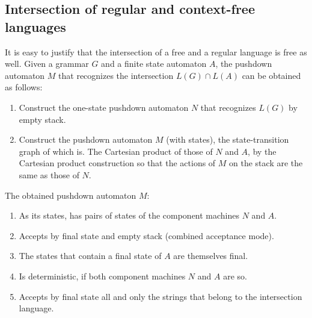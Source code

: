 \subsection*{Intersection of regular and context-free languages}
It is easy to justify that the intersection of a free and a regular language is free as well. 
Given a grammar $G$ and a finite state automaton $A$, the pushdown automaton $M$ that recognizes the intersection $L(G) \cap L(A)$ can be obtained as follows: 
\begin{enumerate}
    \item Construct the one-state pushdown automaton $N$ that recognizes $L (G)$ by empty stack. 
    \item Construct the pushdown automaton $M$ (with states), the state-transition graph of which is. 
        The Cartesian product of those of $N$ and $A$, by the Cartesian product construction so that the actions of $M$ on the stack are the same as those of $N$. 
\end{enumerate}
The obtained pushdown automaton $M$: 
\begin{enumerate}
    \item As its states, has pairs of states of the component machines $N$ and $A$. 
    \item Accepts by final state and empty stack (combined acceptance mode). 
    \item The states that contain a final state of $A$ are themselves final. 
    \item Is deterministic, if both component machines $N$ and $A$ are so. 
    \item Accepts by final state all and only the strings that belong to the intersection language.
\end{enumerate}

